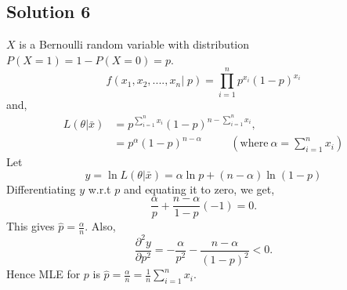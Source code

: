 \documentclass[a4paper,english,12pt]{article}
\begin{document}
\hypertarget{solution6}{\subsection*{Solution 6}}
$X$ is a Bernoulli random variable with distribution $P(X=1)= 1-P(X=0)= p$.
\begin{equation*}
f(x_1,x_2,....,x_n|\;p)= \prod_{i=1}^{n}p^{x_i}(1-p)^{x_{i}}
\end{equation*}
and,
\begin{align*}
L(\theta|\bar{x})&= p^{\sum_{i=1}^{n}x_{i}} (1-p)^{n-\sum_{i=1}^{n}x_{i}},\\
&=p^{\alpha}(1-p)^{n-\alpha}\hspace{1cm}~(\mbox{where}~\alpha = \sum_{i=1}^{n}x_{i})
\end{align*}
Let
\begin{equation*}
y= \ln L(\theta|\bar{x}) = \alpha\ln p + (n-\alpha)\ln(1-p)
\end{equation*}
Differentiating $y$ w.r.t $p$ and equating it to zero, we get,
\begin{equation*}
\frac{\alpha}{p} + \frac{n-\alpha}{1-p}(-1)=0.
\end{equation*}
This gives $\hat{p} = \frac{\alpha}{n}$. Also,
\begin{equation*}
\frac{\partial^{2}y}{\partial p^{2}} = -\frac{\alpha}{p^{2}} - \frac{n-\alpha}{(1-p)^{2}}<0.
\end{equation*}
Hence MLE for $p$ is $\hat{p}=\frac{\alpha}{n}=\frac{1}{n}\sum_{i=1}^{n}x_{i}$.
\end{document}
